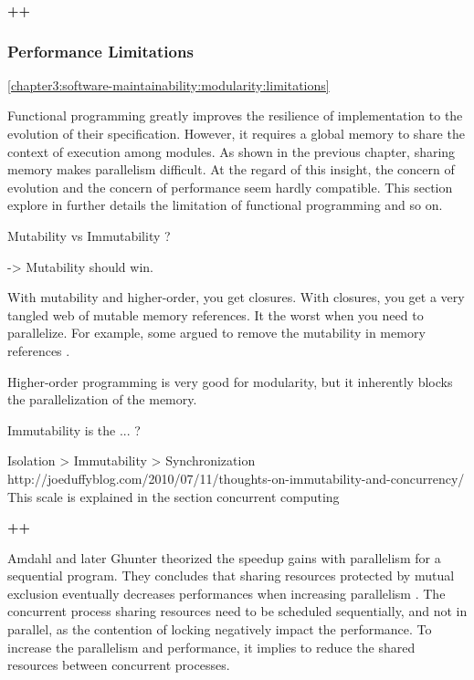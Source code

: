 \textbf{++}

\subsubsection{Performance Limitations} \ref{chapter3:software-maintainability:modularity:limitations}

Functional programming greatly improves the resilience of implementation to the evolution of their specification.
However, it requires a global memory to share the context of execution among modules.
As shown in the previous chapter, sharing memory makes parallelism difficult.
At the regard of this insight, the concern of evolution and the concern of performance seem hardly compatible.
This section explore in further details the limitation of functional programming and so on.

Mutability vs Immutability ?

-> Mutability should win.

With mutability and higher-order, you get closures.
With closures, you get a very tangled web of mutable memory references.
It the worst when you need to parallelize.
For example, some argued to remove the mutability in memory references \cite{Gordon2012} \cite{Matsakis2012a}.

Higher-order programming is very good for modularity, but it inherently blocks the parallelization of the memory.


Immutability is the ... ? \cite{Gordon2012}

Isolation > Immutability > Synchronization
http://joeduffyblog.com/2010/07/11/thoughts-on-immutability-and-concurrency/
This scale is explained in the section concurrent computing

\textbf{++}

Amdahl \cite{Amdahl1967} and later Ghunter \cite{Gunther1993} theorized the speedup gains with parallelism for a sequential program.
They concludes that sharing resources protected by mutual exclusion eventually decreases performances when increasing parallelism \cite{Gustafson1988,Gunther1996,Nelson1996,Gunther2002}.
The concurrent process sharing resources need to be scheduled sequentially, and not in parallel, as the contention of locking negatively impact the performance.
To increase the parallelism and performance, it implies to reduce the shared resources between concurrent processes.

